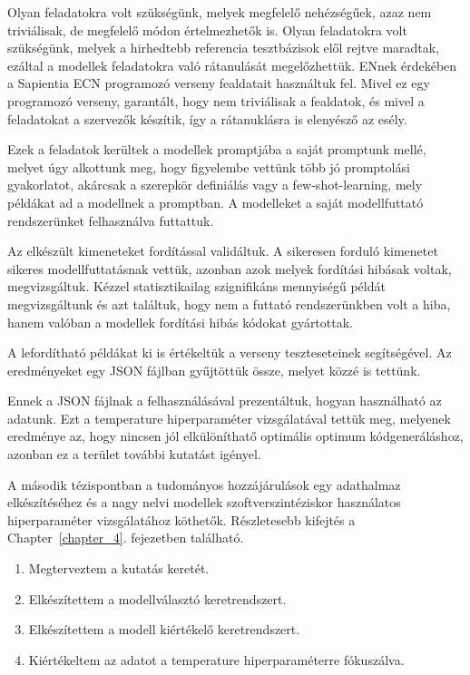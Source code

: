 Olyan feladatokra volt szükségünk, melyek megfelelő nehézségűek, azaz nem triviálisak, de megfelelő módon értelmezhetők is.
Olyan feladatokra volt szükségünk, melyek a hirhedtebb referencia tesztbázisok elől rejtve maradtak, ezáltal a modellek feladatokra való rátanulását megelőzhettük.
ENnek érdekében a Sapientia ECN programozó verseny fealdatait használtuk fel.
Mivel ez egy programozó verseny, garantált, hogy nem triviálisak a fealdatok, és mivel a feladatokat a szervezők készítik, így a rátanuklásra is elenyésző az esély.

Ezek a feladatok kerültek a modellek promptjába a saját promptunk mellé, melyet úgy alkottunk meg, hogy figyelembe vettünk több jó promptolási gyakorlatot, a\-kár\-csak a szerepkör definiálás vagy a few-shot-learning, mely példákat ad a modellnek a promptban.
A modelleket a saját modellfuttató rendszerünket felhasználva futtattuk.

Az elkészült kimeneteket fordítással validáltuk.
A sikeresen forduló kimenetet sikeres modellfuttatásnak vettük, azonban azok melyek fordítási hibásak voltak, meg\-vizs\-gál\-tuk.
Kézzel statisztikailag szignifikáns mennyiségű példát megvizsgáltunk és azt találtuk, hogy nem a futtató rendszerünkben volt a hiba, hanem valóban a modellek fordítási hibás kódokat gyártottak.

A lefordítható példákat ki is értékeltük a verseny teszteseteinek segítségével.
Az eredményeket egy JSON fájlban gyűjtöttük össze, melyet közzé is tettünk.

Ennek a JSON fájlnak a felhasználásával prezentáltuk, hogyan használható az adatunk.
Ezt a temperature hiperparaméter vizsgálatával tettük meg, melyenek eredménye az, hogy nincsen jól elkülöníthatő optimális optimum kódgeneráláshoz, azonban ez a terület további kutatást igényel.

\vspace{1cm}

\noindent
A második tézispontban a tudományos hozzájárulások egy adathalmaz el\-ké\-szí\-té\-sé\-hez és a nagy nelvi modellek szoftverszintéziskor használatos hiperparaméter vizs\-gá\-la\-tá\-hoz köthetők.
Részletesebb kifejtés a Chapter~\ref{chapter_4}. fejezetben található.

\begin{enumerate}[wide = 0pt, widest = {II/5.}, leftmargin =*]
	
	\item[II/1.] Megterveztem a kutatás keretét.
	
	\item[II/2.] Elkészítettem a modellválasztó keretrendszert.
	
	\item[II/3.] Elkészítettem a modell kiértékelő keretrendszert.
	
	\item[II/4.] Kiértékeltem az adatot a temperature hiperparaméterre fókuszálva.
	
\end{enumerate}


